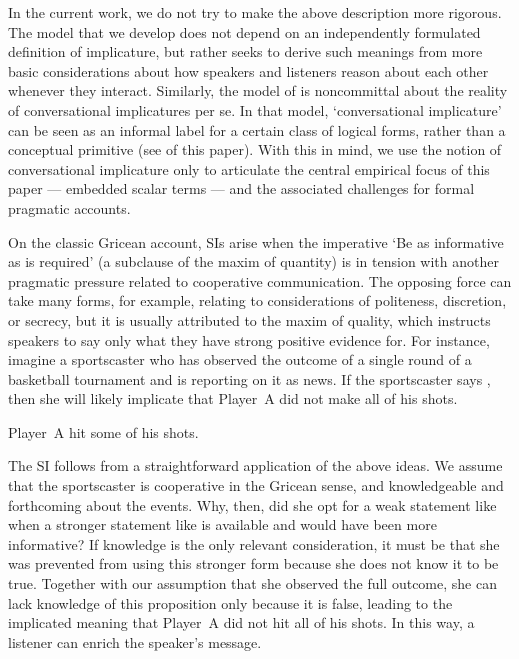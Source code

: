 \documentclass[leqno,12pt]{article}
\begin{document}
In the current work, we do not try to make the above description more
rigorous. The model that we develop does not depend on an
independently formulated definition of implicature, but rather seeks
to derive such meanings from more basic considerations about how
speakers and listeners reason about each other whenever they
interact. Similarly, the model of \citet{ChierchiaFoxSpector08} is
noncommittal about the reality of conversational implicatures per
se. In that model, `conversational implicature' can be seen as an informal
label for a certain class of logical forms, rather than a conceptual
primitive (see  of this paper). With this in mind, we
use the notion of conversational implicature only to articulate the
central empirical focus of this paper --- embedded scalar terms ---
and the associated challenges for formal pragmatic accounts.

On the classic Gricean account, SIs arise when the imperative `Be as
informative as is required' (a subclause of the maxim of quantity) is
in tension with another pragmatic pressure related to cooperative
communication. The opposing force can take many forms, for example,
relating to considerations of politeness, discretion, or secrecy, but
it is usually attributed to the maxim of quality, which instructs
speakers to say only what they have strong positive evidence for. For
instance, imagine a sportscaster who has observed the outcome of a
single round of a basketball tournament and is reporting on it as
news. If the sportscaster says , then she will likely
implicate that Player~A did not make all of his shots.
%
\begin{examples}
\item\label{some} Player~A hit some of his shots.
\end{examples}

The SI follows from a straightforward application of the above
ideas. We assume that the sportscaster is cooperative in the Gricean
sense, and knowledgeable and forthcoming about the events. Why, then,
did she opt for a weak statement like  when a stronger statement like  is available and would have been more informative?  If
knowledge is the only relevant consideration, it must be that she was
prevented from using this stronger form because she does not know it
to be true. Together with our assumption that she observed the full
outcome, she can lack knowledge of this proposition only because it is
false, leading to the implicated meaning that Player~A did not hit all
of his shots. In this way, a listener can enrich the speaker's
message.
\end{document}
